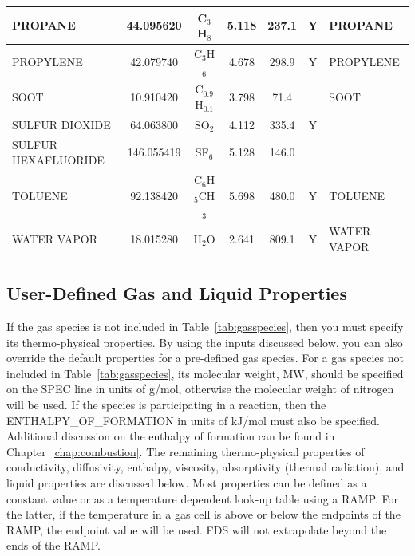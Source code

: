 \documentclass[11pt]{book}
\begin{document}
\begin{longtable}{@{\extracolsep{\fill}}|l|c|c|c|c|c|l|}
{\ct PROPANE}            & 44.095620  & C$_3$H$_8$       & 5.118    & 237.1    &  Y       &  {\ct PROPANE}             \\ \hline
{\ct PROPYLENE}          & 42.079740  & C$_3$H$_6$       & 4.678    & 298.9    &  Y       &  {\ct PROPYLENE}           \\ \hline
{\ct SOOT}               & 10.910420  & C$_{0.9}$H$_{0.1}$ & 3.798    & 71.4     &          &  {\ct SOOT}                \\ \hline
{\ct SULFUR DIOXIDE}     & 64.063800  & SO$_2$           & 4.112    & 335.4    &  Y       &                            \\ \hline
{\ct SULFUR HEXAFLUORIDE}& 146.055419 & SF$_6$           & 5.128    & 146.0    &          &                            \\ \hline
{\ct TOLUENE}            & 92.138420  & C$_6$H$_5$CH$_3$ & 5.698    & 480.0    &  Y       &  {\ct TOLUENE}             \\ \hline
{\ct WATER VAPOR}        & 18.015280  & H$_2$O           & 2.641    & 809.1    &  Y       &  {\ct WATER VAPOR}         \\ \hline
\end{longtable}


\subsection{User-Defined Gas and Liquid Properties}
\label{user_defined_gas_species_props}

If the gas species is not included in Table~\ref{tab:gasspecies}, then you must specify its thermo-physical properties.  By using the inputs discussed below, you can also override the default properties for a pre-defined gas species.  For a gas species not included in Table~\ref{tab:gasspecies}, its molecular weight, {\ct MW}, should be specified on the {\ct SPEC} line in units of g/mol, otherwise the molecular weight of nitrogen will be used.  If the species is participating in a reaction, then the {\ct ENTHALPY\_OF\_FORMATION} in units of kJ/mol must also be specified. Additional discussion on the enthalpy of formation can be found in Chapter~\ref{chap:combustion}.  The remaining thermo-physical properties of conductivity, diffusivity, enthalpy, viscosity, absorptivity (thermal radiation), and liquid properties are discussed below. Most properties can be defined as a constant value or as a temperature dependent look-up table using a {\ct RAMP}. For the latter, if the temperature in a gas cell is above or below the endpoints of the {\ct RAMP}, the endpoint value will be used. FDS will not extrapolate beyond the ends of the {\ct RAMP}.
\end{document}
